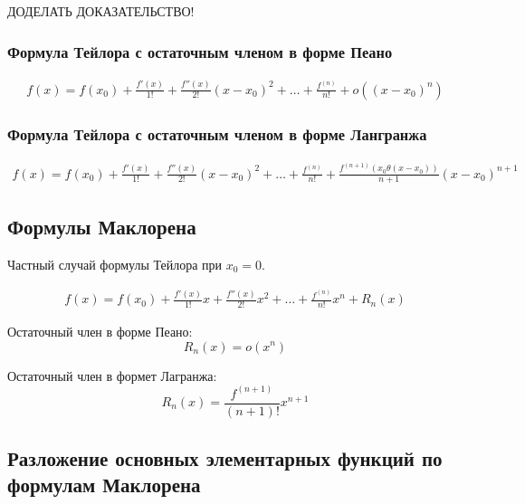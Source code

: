 ДОДЕЛАТЬ ДОКАЗАТЕЛЬСТВО!

\subsubsection{Формула Тейлора с остаточным членом в форме Пеано}

\begin{align*}
  f(x) = f(x_0) + \frac{f'(x)}{1!} + \frac{f''(x)}{2!}(x - x_0)^2 + \ldots + \frac{f^{(n)}}{n!} + o((x - x_0)^n)
\end{align*}

\subsubsection{Формула Тейлора с остаточным членом в форме Лангранжа}

\begin{align*}
  f(x) = f(x_0) + \frac{f'(x)}{1!} + \frac{f''(x)}{2!}(x - x_0)^2 + \ldots + \frac{f^{(n)}}{n!} + \frac{f^{(n+1)}\left( x_0 \theta(x - x_0) \right) }{n+1}(x-x_0)^{n+1}
\end{align*}

\subsection{Формулы Маклорена}

Частный случай формулы Тейлора при $x_0 = 0$.

\begin{align*}
  f(x) = f(x_0) + \frac{f'(x)}{1!} x + \frac{f''(x)}{2!} x^2 + \ldots + \frac{f^{(n)}}{n!} x^n + R_n(x)
\end{align*}

Остаточный член в форме Пеано: \[
  R_n(x) = o(x^n) 
\] 

Остаточный член в формет Лагранжа: \[
  R_n(x) = \frac{f^{(n+1)}}{(n+1)!}x^{n+1}
\] 

\subsection{Разложение основных элементарных функций по формулам Маклорена}

